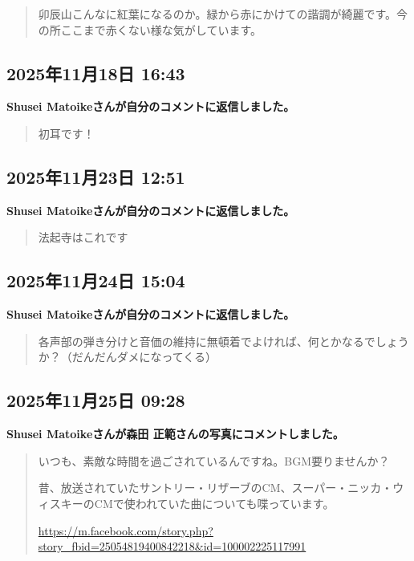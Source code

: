\begin{quote}
卯辰山こんなに紅葉になるのか。緑から赤にかけての諧調が綺麗です。今の所ここまで赤くない様な気がしています。
\end{quote}

\subsection*{2025年11月18日 16:43}

\textbf{Shusei Matoikeさんが自分のコメントに返信しました。}

\begin{quote}
初耳です！
\end{quote}

\subsection*{2025年11月23日 12:51}

\textbf{Shusei Matoikeさんが自分のコメントに返信しました。}

\begin{quote}
法起寺はこれです
\end{quote}

\subsection*{2025年11月24日 15:04}

\textbf{Shusei Matoikeさんが自分のコメントに返信しました。}

\begin{quote}
各声部の弾き分けと音価の維持に無頓着でよければ、何とかなるでしょうか？（だんだんダメになってくる）
\end{quote}

\subsection*{2025年11月25日 09:28}

\textbf{Shusei Matoikeさんが森田 正範さんの写真にコメントしました。}

\begin{quote}
いつも、素敵な時間を過ごされているんですね。BGM要りませんか？

昔、放送されていたサントリー・リザーブのCM、スーパー・ニッカ・ウィスキーのCMで使われていた曲についても喋っています。

\url{https://m.facebook.com/story.php?story_fbid=25054819400842218&id=100002225117991}
\end{quote}

